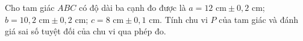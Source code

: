 \begin{ex}
Cho tam giác $ABC$ có độ dài ba cạnh đo được là $a=12\text{ cm}\pm0{,}2\text{ cm}$; $b=10{,}2\text{ cm}\pm0{,}2\text{ cm}$; $c=8\text{ cm}\pm0{,}1\text{ cm}$. Tính chu vi $P$ của tam giác và đánh giá sai số tuyệt đối của chu vi qua phép đo.
\end{ex}
